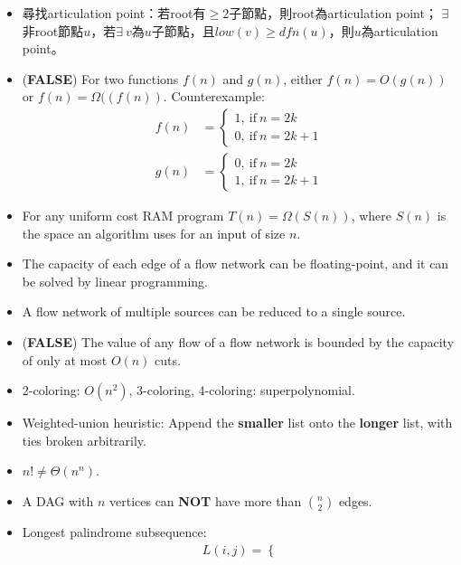 \begin{itemize}
\begin{algorithm}[H]
    \end{algorithm}
    \item 尋找articulation point：若root有$\ge 2$子節點，則root為articulation point；
    $\exists$ 非root節點$u$，若$\exists \ v$為$u$子節點，且$low(v) \ge dfn(u)$，則$u$為articulation point。
    \item (\textbf{FALSE}) For two functions $f(n)$ and $g(n)$, either $f(n) = O(g(n))$ or $f(n) = \Omega((f(n))$.
    Counterexample:\begin{equation}
        \begin{aligned}
            f(n) & = \begin{cases}
                1, \ \text{if} \ n = 2k \\
                0, \ \text{if} \ n = 2k + 1
            \end{cases} \\
            g(n) & = \begin{cases}
                0, \ \text{if} \ n = 2k \\
                1, \ \text{if} \ n = 2k + 1
            \end{cases} 
        \end{aligned}
    \end{equation}
    \item For any uniform cost RAM program $T(n) = \Omega(S(n))$, where $S(n)$ is the space an algorithm uses for an input of size $n$.
    \item The capacity of each edge of a flow network can be floating-point, and it can be solved by linear programming.
    \item A flow network of multiple sources can be reduced to a single source.
    \item (\textbf{FALSE}) The value of any flow of a flow network is bounded by the capacity of only at most $O(n)$ cuts.
    \item 2-coloring: $O(n^2)$, 3-coloring, 4-coloring: superpolynomial.
    \item Weighted-union heuristic: Append the \textbf{smaller} list onto the \textbf{longer} list, with ties broken arbitrarily.
    \item $n! \neq \Theta(n^n)$.
    \item A DAG with $n$ vertices can \textbf{NOT} have more than $\binom{n}{2}$ edges.
    \item Longest palindrome subsequence: \begin{equation}
        \begin{aligned}
            & L(i, j) = \begin{cases}

\end{cases}
\end{aligned}
\end{equation}
\end{itemize}
